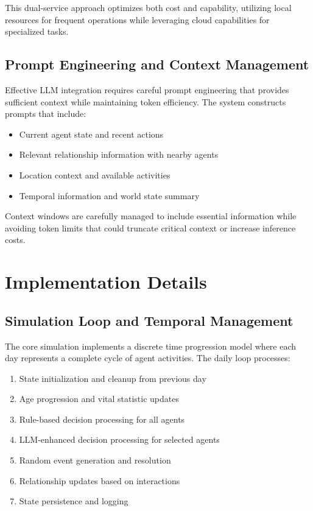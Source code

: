 \documentclass[conference]{IEEEtran}
\begin{document}
This dual-service approach optimizes both cost and capability, utilizing local resources for frequent operations while leveraging cloud capabilities for specialized tasks.

\subsection{Prompt Engineering and Context Management}

Effective LLM integration requires careful prompt engineering that provides sufficient context while maintaining token efficiency. The system constructs prompts that include:

\begin{itemize}
\item Current agent state and recent actions
\item Relevant relationship information with nearby agents
\item Location context and available activities
\item Temporal information and world state summary
\end{itemize}

Context windows are carefully managed to include essential information while avoiding token limits that could truncate critical context or increase inference costs.

\section{Implementation Details}

\subsection{Simulation Loop and Temporal Management}

The core simulation implements a discrete time progression model where each day represents a complete cycle of agent activities. The daily loop processes:

\begin{enumerate}
\item State initialization and cleanup from previous day
\item Age progression and vital statistic updates
\item Rule-based decision processing for all agents
\item LLM-enhanced decision processing for selected agents
\item Random event generation and resolution
\item Relationship updates based on interactions
\item State persistence and logging
\end{enumerate}
\end{document}
